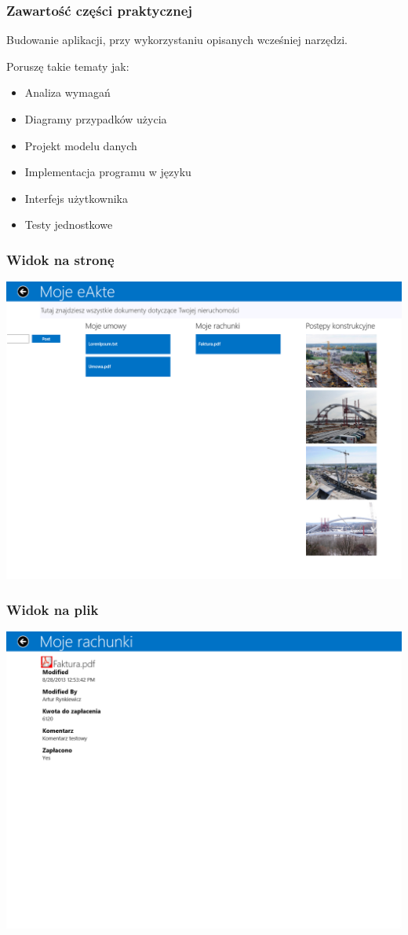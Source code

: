\begin{frame}
\frametitle{Zawartość części praktycznej}
Budowanie aplikacji, przy wykorzystaniu opisanych wcześniej narzędzi.

Poruszę takie tematy jak:
\begin{itemize}
\item Analiza wymagań
\item Diagramy przypadków użycia
\item Projekt modelu danych
\item Implementacja programu w języku \Csharp
\item Interfejs użytkownika
\item Testy jednostkowe
\end{itemize}
\end{frame}

\begin{frame}[fragile]
\frametitle{Widok na stronę}
\includegraphics[width=\textwidth]{app_site}
\end{frame}

\begin{frame}[fragile]
\frametitle{Widok na plik}
\includegraphics[width=\textwidth]{app_file}
\end{frame}

